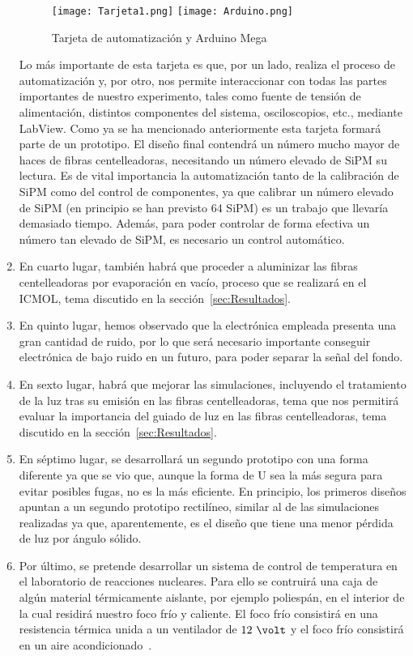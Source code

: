 \begin{enumerate}
\begin{figure}[htb]
\centering
{
\texttt{[image: Tarjeta1.png]} 
}
{
\texttt{[image: Arduino.png]} 
}
\caption{Tarjeta de automatización y Arduino Mega\label{arduino}}
\end{figure} 

Lo más importante de esta tarjeta es que, por un lado, realiza el proceso de automatización y, por otro, nos permite interaccionar con todas las partes importantes de nuestro experimento, tales como fuente de tensión de alimentación,  distintos componentes del sistema, osciloscopios, etc., mediante LabView.
Como ya se ha mencionado anteriormente esta tarjeta formará parte de un prototipo. El diseño final contendrá un número mucho mayor de haces de fibras centelleadoras, necesitando un número elevado de SiPM su lectura. Es de vital importancia  la automatización tanto de la calibración de SiPM como del control de componentes, ya que calibrar un número elevado de SiPM (en principio se han previsto 64 SiPM) es un trabajo que llevaría demasiado tiempo. Además, para poder controlar de forma efectiva un número tan elevado de SiPM, es necesario un control automático. 

\item {} En cuarto lugar, también habrá que proceder a aluminizar las fibras centelleadoras  por evaporación en vacío, proceso que se realizará en el ICMOL, tema discutido en la sección~\ref{sec:Resultados}.

\item {} En quinto lugar, hemos observado que la electrónica empleada presenta una gran cantidad de ruido, por lo que será necesario importante conseguir electrónica de bajo ruido en un futuro, para poder separar la señal del fondo.

\item {} En sexto lugar, habrá que mejorar las simulaciones, incluyendo el  tratamiento de la luz tras su emisión en las fibras centelleadoras, tema que nos permitirá evaluar la importancia del guiado de luz en las fibras centelleadoras, tema discutido en la sección~\ref{sec:Resultados}.

\item {} En séptimo lugar, se desarrollará un segundo prototipo con una forma diferente ya que se vio que, aunque la forma de U sea la más segura para evitar posibles fugas, no es la más eficiente. En principio, los primeros diseños apuntan a un segundo prototipo rectilíneo, similar al de las simulaciones realizadas ya que, aparentemente, es el diseño que tiene una menor pérdida de luz por ángulo sólido.

\item {} Por último, se pretende desarrollar un sistema de control de temperatura  en el laboratorio de reacciones nucleares. Para ello se contruirá una caja de algún material térmicamente aislante, por ejemplo poliespán, en el interior de la cual residirá nuestro foco frío y caliente. El foco frío consistirá en una resistencia térmica unida  a un ventilador de $12~\volt$ y el foco frío consistirá en un aire acondicionado~\cite{Camara}.

\end{enumerate}